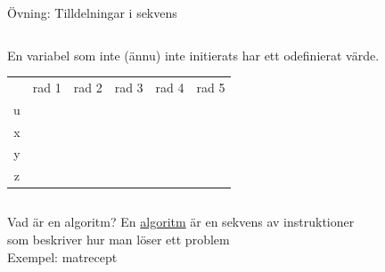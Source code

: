 \documentclass{lecturenotes}
\begin{document}
\begin{Slide}{Övning: Tilldelningar i sekvens}\footnotesize
\begin{columns}
\begin{column}{0.6\textwidth}

En variabel som inte (ännu) inte initierats har ett odefinierat värde.
\begin{table}[] 
\centering\scriptsize
\newcommand{\mybox}[1]{\raisebox{-0.5mm}{\framebox(21,14){#1}}\vspace{0.5mm}}
\begin{tabular}{cccccc}
 & rad 1 & rad 2 & rad 3 & rad 4  & rad 5\\ 
u& \mybox{? } &  \mybox{}   &   \mybox{}   & \mybox{} & \mybox{} \\
x& \mybox{? } &  \mybox{}   &   \mybox{}   & \mybox{} & \mybox{} \\
y& \mybox{? } &  \mybox{}   &   \mybox{}   & \mybox{} & \mybox{} \\
z& \mybox{? } &  \mybox{}   &   \mybox{}   & \mybox{} & \mybox{} \\
\end{tabular}
\end{table}

\end{column}
\end{columns}
\end{Slide}

\begin{Slide}{Vad är en algoritm?}
En \href{https://sv.wikipedia.org/wiki/Algoritm}{algoritm} är en sekvens av instruktioner\\ som beskriver hur man löser ett problem \\
\vspace{2em}
Exempel: matrecept
\end{Slide}
\end{document}
